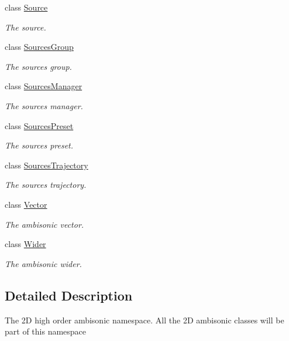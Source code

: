 \begin{DoxyCompactItemize}
class \hyperlink{class_hoa2_d_1_1_source}{Source}
\begin{DoxyCompactList}\small\item\em The source. \end{DoxyCompactList}\item 
class \hyperlink{class_hoa2_d_1_1_sources_group}{Sources\-Group}
\begin{DoxyCompactList}\small\item\em The sources group. \end{DoxyCompactList}\item 
class \hyperlink{class_hoa2_d_1_1_sources_manager}{Sources\-Manager}
\begin{DoxyCompactList}\small\item\em The sources manager. \end{DoxyCompactList}\item 
class \hyperlink{class_hoa2_d_1_1_sources_preset}{Sources\-Preset}
\begin{DoxyCompactList}\small\item\em The sources preset. \end{DoxyCompactList}\item 
class \hyperlink{class_hoa2_d_1_1_sources_trajectory}{Sources\-Trajectory}
\begin{DoxyCompactList}\small\item\em The sources trajectory. \end{DoxyCompactList}\item 
class \hyperlink{class_hoa2_d_1_1_vector}{Vector}
\begin{DoxyCompactList}\small\item\em The ambisonic vector. \end{DoxyCompactList}\item 
class \hyperlink{class_hoa2_d_1_1_wider}{Wider}
\begin{DoxyCompactList}\small\item\em The ambisonic wider. \end{DoxyCompactList}\end{DoxyCompactItemize}


\subsection{Detailed Description}
The 2\-D high order ambisonic namespace. All the 2\-D ambisonic classes will be part of this namespace 